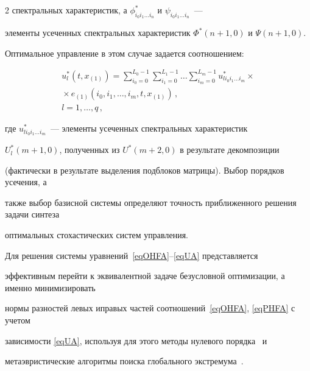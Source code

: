 \begin{multicols}{2}
спектральных характеристик, а $\phi^*_{i_0 i_1 \dots i_n}$ и $\psi_{i_0 i_1 \dots i_n}$~--- 


элементы усеченных спект\-раль\-ных характеристик ${\Phi^*(n+1,0)}$ и ${\Psi(n+1,0)}$. 


Оптимальное управление в этом случае задается соотношением:


\begin{multline}


\label{eqUInvertTr}


  u^*_l(t,x_{(1)}) = \sum\limits_{i_0 = 0}^{L_0 - 1} 


  \sum\limits_{i_1 = 0}^{L_1 - 1} \dots 


  \sum\limits_{i_m = 0}^{L_m - 1} u^*_{l i_0 i_1 \dots i_m} \times{}\\[2pt]


  {}\times 


  e_{(1)}(i_0,i_1,\dots,i_m,t,x_{(1)})\,, \\[2pt]


   l = 1,\dots,q\,,


\end{multline}


где $u^*_{l i_0 i_1 \dots i_m}$~--- элементы усеченных спектральных характеристик 


${U^*_l(m+1,0)}$, полученных из ${U^*(m+2,0)}$ в результате декомпозиции~\cite{PanRybSot} 


(фактически в результате выделения подблоков мат\-ри\-цы). Выбор порядков усечения, а 


также выбор базисной сис\-те\-мы определяют точность приближенного решения задачи синтеза 


оптимальных стохастических систем управления.





Для решения сис\-те\-мы уравнений~\eqref{eqOHFA}--\eqref{eqUA} представляется 


эффективным перейти к эквивалентной задаче безусловной оптимизации, а именно минимизировать 


нормы разностей левых и\linebreak правых частей соотношений~\eqref{eqOHFA}, \eqref{eqPHFA} с учетом 


зависимости \eqref{eqUA}, используя для этого методы нулевого порядка~\cite{PanLet} и 


метаэвристические алгоритмы поиска глобального экстремума~\cite{Pan_GlobOpt}.






\end{multicols}
